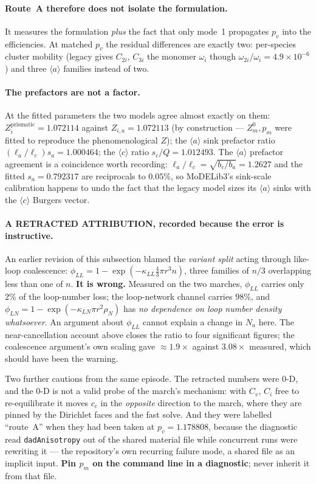 \documentclass[11pt,a4paper]{article}
\newcommand{\code}[1]{\texttt{\small #1}}
\newcommand{\aloop}{\ensuremath{\langle a\rangle}}
\newcommand{\cloop}{\ensuremath{\langle c\rangle}}
\begin{document}
\paragraph{Route~A therefore does not isolate the formulation.} It measures the
formulation \emph{plus} the fact that only mode~1 propagates $p_v$ into the
efficiencies. At matched $p_v$ the residual differences are exactly two:
per-species cluster mobility (legacy gives $C_{2i}$, $C_{3i}$ the monomer
$\omega_i$ though $\omega_{2i}/\omega_i = 4.9\times10^{-6}$) and three \aloop{}
families instead of two.

\paragraph{The prefactors are not a factor.} At the fitted
parameters the two models agree almost exactly on them:
$Z^{\text{prismatic}}_i = 1.072114$ against $Z_{i,a} = 1.072113$ (by
construction --- $Z^0_m, p_m$ were fitted to reproduce the phenomenological
$Z$); the \aloop{} sink prefactor ratio $(\ell_a/\ell_c)s_a = 1.000464$; the
\cloop{} ratio $s_c/Q = 1.012493$. The \aloop{} prefactor agreement is a
coincidence worth recording: $\ell_a/\ell_c = \sqrt{b_c/b_a} = 1.2627$ and the
fitted $s_a = 0.792317$ are reciprocals to $0.05\%$, so MoDELib3's sink-scale
calibration happens to undo the fact that the legacy model sizes its \aloop{}
sinks with the \cloop{} Burgers vector.

\paragraph{A RETRACTED ATTRIBUTION, recorded because the error is instructive.}
An earlier revision of this subsection blamed the \emph{variant split} acting
through like-loop coalescence: $\phi_{LL} = 1 - \exp(-\kappa_{LL}\tfrac43\pi
r^3 n)$, three families of $n/3$ overlapping less than one of $n$. \textbf{It is
wrong.} Measured on the two marches, $\phi_{LL}$ carries only $2\%$ of the
loop-number loss; the loop-network channel carries $98\%$, and
$\phi_{LN} = 1 - \exp(-\kappa_{LN}\pi r^2\rho_N)$ has \emph{no dependence on
loop number density whatsoever}. An argument about $\phi_{LL}$ cannot explain a
change in $N_a$ here. The near-cancellation account above closes the ratio to
four significant figures; the coalescence argument's own scaling gave
$\approx 1.9\times$ against $3.08\times$ measured, which should have been the
warning.

Two further cautions from the same episode. The retracted numbers were 0-D, and
the 0-D is not a valid probe of the march's mechanism: with $C_v$, $C_i$ free to
re-equilibrate it moves $c_c$ in the \emph{opposite} direction to the march,
where they are pinned by the Dirichlet faces and the fast solve. And they were
labelled ``route~A'' when they had been taken at $p_v = 1.178808$, because the
diagnostic read \code{dadAnisotropy} out of the shared material file while
concurrent runs were rewriting it --- the repository's own recurring failure
mode, a shared file as an implicit input. \textbf{Pin $p_m$ on the command line
in a diagnostic}; never inherit it from that file.
\end{document}
